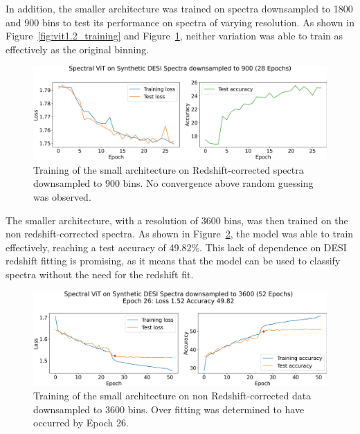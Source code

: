In addition, the smaller architecture was trained on spectra downsampled to 1800 and 900 bins to test 
its performance on spectra of varying resolution. As shown in Figure~\ref{fig:vit1.2_training} and Figure~\ref{fig:vit1.3_training},
neither variation was able to train as effectively as the original binning. 

\begin{figure}
    \centering
    \includegraphics[width=.8\linewidth]{figures/vit_model_V1.3_muchsmallermodeltraining_new.png}
    \caption[Training of Spectral ViT: V1.3]{Training of the small architecture on Redshift-corrected spectra downsampled to 900 bins. No convergence above random guessing was observed. }
    \label{fig:vit1.3_training}
\end{figure}

The smaller architecture, with a resolution of 3600 bins, was then trained on the
non redshift-corrected spectra. As shown in Figure~\ref{fig:vit2_training},
the model was able to train effectively, reaching a test accuracy of 49.82\%. 
This lack of dependence on DESI redshift fitting is promising, as it means that 
the model can be used to classify spectra without the need for the redshift fit. 


\begin{figure}[h]
    \centering
    \includegraphics[width=.8\linewidth]{figures/v2_real/vit_model_V2training_new.png}
    \caption[Training of Spectral ViT: V2]{Training of the small architecture on non Redshift-corrected data downsampled to 3600 bins. Over fitting was determined to have occurred by Epoch 26.}
    \label{fig:vit2_training}
\end{figure}

